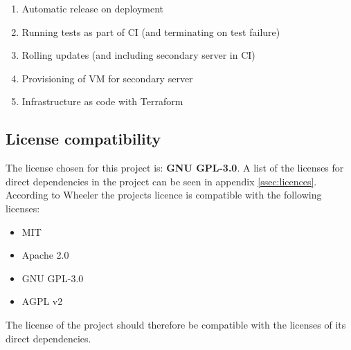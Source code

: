 \begin{enumerate}
    \item Automatic release on deployment
    \item Running tests as part of CI (and terminating on test failure)
    \item Rolling updates (and including secondary server in CI)
    \item Provisioning of VM for secondary server
    \item Infrastructure as code with Terraform
\end{enumerate}

\subsection{License compatibility}
The license chosen for this project is: \textbf{GNU GPL-3.0}. A list of the licenses for direct dependencies in the project can be seen in appendix \ref{ssec:licences}. According to Wheeler\cite{LicenseComp} the projects licence is compatible with the following licenses: 
\begin{itemize}
    \item MIT
    \item Apache 2.0
    \item GNU GPL-3.0
    \item AGPL v2 
\end{itemize}
The license of the project should therefore be compatible with the licenses of its direct dependencies.